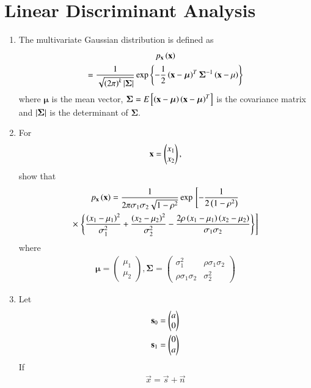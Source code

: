 \documentclass[journal,12pt,twocolumn]{IEEEtran}
\renewcommand\thesection{\arabic{section}}
\begin{document}
\section{Linear Discriminant Analysis}
\begin{enumerate}[label=\thesection.\arabic*
,ref=\thesection.\theenumi]
\item The multivariate Gaussian distribution is defined as
%
\begin{multline}
p_{\mathbf{x}}\left(\mathbf{x}\right)
\\
=\frac{1}{\sqrt{\left(2\pi\right)^k\left\vert\bm{\Sigma}\right\vert}}\exp\left\{-\frac{1}{2}\left(\mathbf{x}-\bm{\mu}\right)^T\bm{\Sigma}^{-1}\left(\mathbf{x}-\mathbf{\mu}\right)\right\}
\end{multline}
%
where $\bm{\mu}$ is the mean vector, $\bm{\Sigma} = E{}\left[\left(\mathbf{x}-\bm{\mu}\right)\left(\mathbf{x}-\bm{\mu}\right)^T\right]$ is the covariance matrix and $\left\vert\bm{\Sigma}\right\vert$ is the determinant of $\bm{\Sigma}$.
\item For
\begin{align}
\mathbf{x} = \begin{pmatrix}x_1\\x_2\end{pmatrix},
\end{align}
show that
{\small
\begin{multline}
p_{\mathbf{x}}\left(\mathbf{x}\right)= \frac{1}{2\pi 
\sigma_{1}\sigma_2\sqrt{1-\rho^2}}\exp{}\left[-\frac{1}{2\left(1-\rho^2\right)}\right.
\\
\times 
{}\left.\left\{\frac{\left(x_1-\mu_1\right)^2}{\sigma_1^2}+\frac{\left(x_2-\mu_2\right)^2}{\sigma_2^2}-\frac{2\rho\left(x_1-\mu_1\right)\left(x_2-\mu_2\right)}{\sigma_1\sigma_2}\right\}\right]
\end{multline}
}
%
where
%
\begin{align}
\bm{\mu}=
\begin{pmatrix*}
\mu_1 \\
\mu_2
\end{pmatrix*},
\bm{\Sigma} = 
\begin{pmatrix*}%
\sigma_1^2 & \rho\sigma_1\sigma_2 \\
\rho\sigma_1\sigma_2 & \sigma_2^2
\end{pmatrix*}
\end{align}
%
\item Let
%
\begin{align}
\mathbf{s}_0=\begin{pmatrix}a\\0\end{pmatrix}
\\
\mathbf{s}_1=\begin{pmatrix}0\\a\end{pmatrix}
\end{align}
If 
\begin{align}
\vec{x} = \vec{s} + \vec{n}
\end{align}

\end{enumerate}
\end{document}
